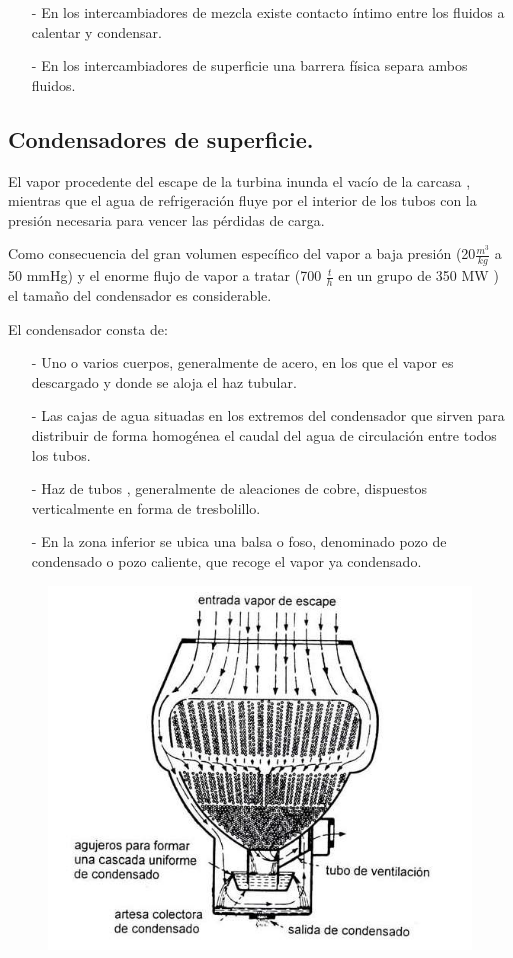 \begin{itemize}
	\item [-] En los intercambiadores de mezcla existe contacto íntimo entre los fluidos a calentar y condensar.
	\item [-] En los intercambiadores de superficie una barrera física separa ambos fluidos.
\end{itemize}

\subsection{Condensadores de superficie.}
El vapor procedente del
escape de la turbina inunda el vacío de la carcasa , mientras que el agua de refrigeración
fluye por el interior de los tubos con la presión necesaria para vencer las pérdidas de carga.



Como consecuencia del gran volumen específico del vapor a baja presión (20$\frac{m^3}{
	kg}$ a 50
mmHg) y el enorme flujo de vapor a tratar (700 $\frac{t}{h}$ en un grupo de 350 MW ) el tamaño del
condensador es considerable.



El condensador consta de:
\begin{itemize}
	\item [-] Uno o varios cuerpos, generalmente de acero, en los que el vapor es descargado y donde se
	aloja el haz tubular.
	\item [-] Las cajas de agua situadas en los extremos del condensador que sirven para distribuir de
	forma homogénea el caudal del agua de circulación entre todos los tubos.
	\item [-] Haz de tubos , generalmente de aleaciones de cobre, dispuestos verticalmente en forma de
	tresbolillo.
	\item [-] En la zona inferior se ubica una balsa o foso, denominado pozo de condensado o pozo
	caliente, que recoge el vapor ya condensado.
\end{itemize}
\begin{figure}[H]
	\centering
	\includegraphics[width=0.7\linewidth]{res/tema10/condensador}
	\label{fig:condensador}
\end{figure}

